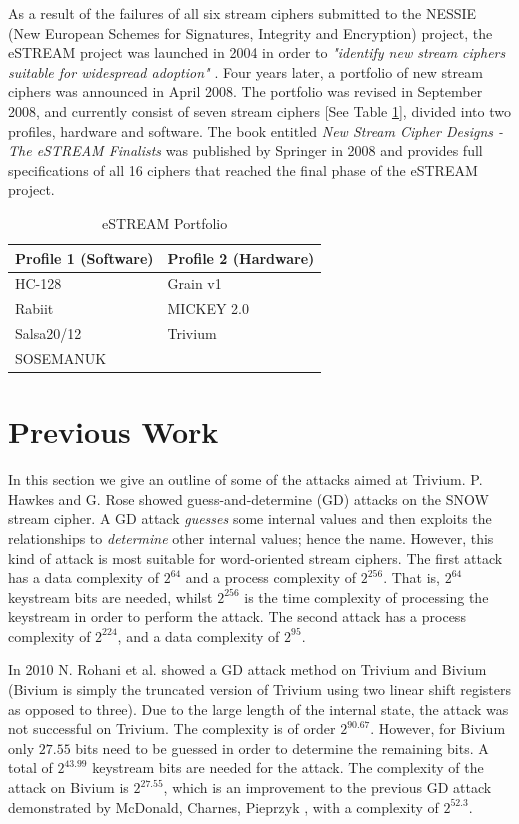 \documentclass[conference]{IEEEtran}
\begin{document}
As a result of the failures of all six stream ciphers submitted to the NESSIE (New European Schemes for Signatures, Integrity and Encryption) project, the eSTREAM project was launched in 2004 in order to \textit{"identify new stream ciphers suitable for widespread adoption"} \cite{call}. Four years later, a portfolio of new stream ciphers was announced in April 2008. The portfolio was revised in September 2008, and currently consist of seven stream ciphers [See Table \ref{tab:portfolio}], divided into two profiles, hardware and software. The book entitled \textit{New Stream Cipher Designs - The eSTREAM Finalists} \cite{book} was published by Springer in 2008 and provides full specifications of all 16 ciphers that reached the final phase of the eSTREAM project.
\begin{table}[H]
\centering
\begin{tabular}{|l|l|}\hline
Profile 1 (Software) & Profile 2 (Hardware)\\\hline
HC-128 & Grain v1\\
Rabiit & MICKEY 2.0\\
Salsa20/12 & Trivium\\
SOSEMANUK & \\\hline
\end{tabular}
\caption{eSTREAM Portfolio}
\label{tab:portfolio}
\end{table}

\section{Previous Work}\label{sec:previous-work}

In this section we give an outline of some of the attacks aimed at Trivium. 
P. Hawkes and G. Rose showed guess-and-determine (GD) attacks on the SNOW stream cipher. A GD attack \textit{guesses} some internal values and then exploits the relationships to \textit{determine} other internal values; hence the name. However, this kind of attack is most suitable for word-oriented stream ciphers. The first attack has a data complexity of $2^{64}$ and a process complexity of $2^{256}$. That is, $2^{64}$ keystream bits are needed, whilst $2^{256}$ is the time complexity of processing the keystream in order to perform the attack. The second attack has a process complexity of $2^{224}$, and a data complexity of $2^{95}$.\cite{Hawkes2003}

In 2010 N. Rohani et al. showed a GD attack method on Trivium and Bivium \cite{Rohani2010} (Bivium is simply the truncated version of Trivium using two linear shift registers as opposed to three).
Due to the large length of the internal state, the attack was not successful on Trivium. The complexity is of order $2^{90.67}$. However, for Bivium only $27.55$ bits need to be guessed in order to determine the remaining bits. A total of $2^{43.99}$ keystream bits are needed for the attack. The complexity of the attack on Bivium is $2^{27.55}$, which is an improvement to the previous GD attack demonstrated by McDonald, Charnes, Pieprzyk \cite{biv-old}, with a complexity of $2^{52.3}$.
\end{document}
